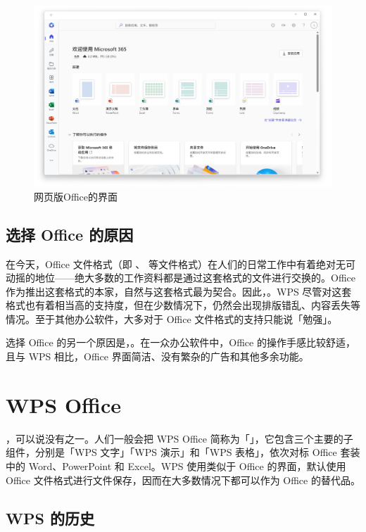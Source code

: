 \begin{figure}[htb!]
  \centering
  \includegraphics[width=.7\textwidth]{assets/software/Fake_Office_2.png}
  \caption{网页版Office的界面}
  \label{fig:Fake_Office_2}
\end{figure}

\subsection{选择 Office 的原因}

在今天，Office 文件格式（即 、 等文件格式）在人们的日常工作中有着绝对无可动摇的地位——绝大多数的工作资料都是通过这套格式的文件进行交换的。Office 作为推出这套格式的本家，自然与这套格式最为契合。因此，。WPS 尽管对这套格式也有着相当高的支持度，但在少数情况下，仍然会出现排版错乱、内容丢失等情况。至于其他办公软件，大多对于 Office 文件格式的支持只能说「勉强」。

选择 Office 的另一个原因是，。在一众办公软件中，Office 的操作手感比较舒适，且与 WPS 相比，Office 界面简洁、没有繁杂的广告和其他多余功能。

\section{WPS Office}

，可以说没有之一。人们一般会把 WPS Office 简称为「」，它包含三个主要的子组件，分别是「WPS 文字」「WPS 演示」和「WPS 表格」，依次对标 Office 套装中的 Word、PowerPoint 和 Excel。WPS 使用类似于 Office 的界面，默认使用 Office 文件格式进行文件保存，因而在大多数情况下都可以作为 Office 的替代品。

\subsection{WPS 的历史}

